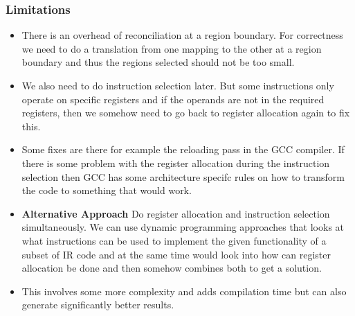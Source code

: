 \subsubsection{Limitations}
\begin{itemize}
    \item There is an overhead of reconciliation at a region boundary. For correctness we need to do a translation from one mapping to the other at a region boundary and thus the regions selected should not be too small.
    \item We also need to do instruction selection later. But some instructions only operate on specific registers and if the operands are not in the required registers, then we somehow need to go back to register allocation again to fix this.
    \item Some fixes are there for example the reloading pass in the GCC compiler. If there is some problem with the register allocation during the instruction selection then GCC has some architecture specifc rules on how to transform the code to something that would work.
    \item \textbf{Alternative Approach} Do register allocation and instruction selection simultaneously. We can use dynamic programming approaches that looks at what instructions can be used to implement the given functionality of a subset of IR code and at the same time would look into how can register allocation be done and then somehow combines both to get a solution.
    \item This involves some more complexity and adds compilation time but can also generate significantly better results.
\end{itemize}
